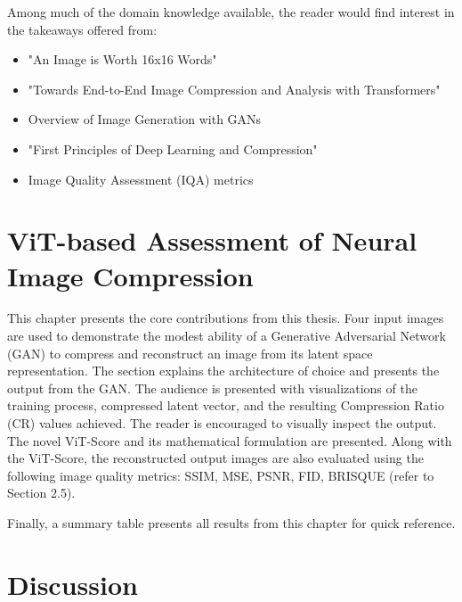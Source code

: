 \documentclass[pdftex,11pt,titlepage,twoside,openright]{report}
\begin{document}
Among much of the domain knowledge available, the reader would find interest in the 
takeaways offered from:

\begin{itemize}
	\item "An Image is Worth 16x16 Words" \citep{dosovitskiy2020vit}
	\item "Towards End-to-End Image Compression and Analysis with Transformers" 

    \citep{Bai2022AAAI}
    \item Overview of Image Generation with GANs
	\item "First Principles of Deep Learning and Compression" \citep{Principles}
	\item Image Quality Assessment (IQA) metrics
    
    \citep{Metrics}
\end{itemize}

\ThinHRule

\newpage


\let\cleardoublepage\clearpage

\chapter{ViT-based Assessment of Neural Image Compression}


This chapter presents the core contributions from this thesis. Four input images
are used to demonstrate the modest ability of a Generative Adversarial Network (GAN) to compress and reconstruct an image from 
its latent space representation. 
The section explains the architecture of choice and presents the output from the GAN.
The audience is presented with visualizations of the training process, compressed latent vector,
and the resulting Compression Ratio (CR) values achieved.
The reader is encouraged to visually inspect the output.
The novel ViT-Score and its mathematical formulation are presented.
Along with the ViT-Score, the reconstructed output images are also evaluated 
using the following image quality metrics: SSIM, MSE, PSNR, FID, BRISQUE (refer to Section 2.5). 

Finally, a summary table presents all results from this chapter for quick reference. 

\ThinHRule

\newpage



\chapter{Discussion}
\end{document}
